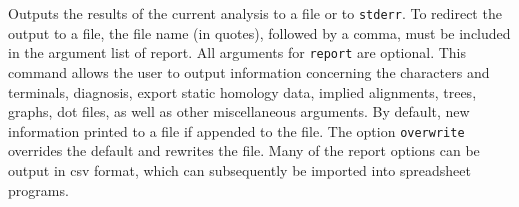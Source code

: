 	\begin{phygdescription}
		{Outputs the results of the current analysis to a file or to \texttt{stderr}. To redirect the 
		output to a file, the file name (in quotes), followed by a comma, must be included in 
		the argument list of report. All arguments for \texttt{report} are optional. This command 
		allows the user to output information concerning the characters and terminals, 
		diagnosis, export static homology data, implied alignments, trees, graphs, dot files, 
		as well as other miscellaneous arguments. By default, new information printed to 
		a file if appended to the file. The option \texttt{overwrite} overrides the default and 
		rewrites the file. Many of the report options can be output in csv format,  which can
		subsequently be imported into spreadsheet programs.}
	\end{phygdescription}
	
